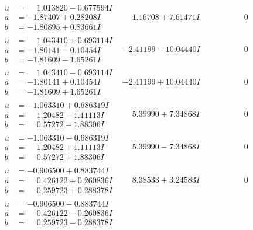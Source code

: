 \documentclass[1p]{elsarticle_modified}
\theoremstyle{definition}
\begin{document}
$$\begin{array}{c|c|c}
\begin{aligned}
u &= \phantom{-}1.013820 - 0.677594 I \\
a &= -1.87407 + 0.28208 I \\
b &= -1.80895 + 0.83661 I\end{aligned}
 & \phantom{-}1.16708 + 7.61471 I & \phantom{-0.000000 } 0 \\ \hline\begin{aligned}
u &= \phantom{-}1.043410 + 0.693114 I \\
a &= -1.80141 - 0.10454 I \\
b &= -1.81609 - 1.65261 I\end{aligned}
 & -2.41199 - 10.04440 I & \phantom{-0.000000 } 0 \\ \hline\begin{aligned}
u &= \phantom{-}1.043410 - 0.693114 I \\
a &= -1.80141 + 0.10454 I \\
b &= -1.81609 + 1.65261 I\end{aligned}
 & -2.41199 + 10.04440 I & \phantom{-0.000000 } 0 \\ \hline\begin{aligned}
u &= -1.063310 + 0.686319 I \\
a &= \phantom{-}1.20482 - 1.11113 I \\
b &= \phantom{-}0.57272 - 1.88306 I\end{aligned}
 & \phantom{-}5.39990 + 7.34868 I & \phantom{-0.000000 } 0 \\ \hline\begin{aligned}
u &= -1.063310 - 0.686319 I \\
a &= \phantom{-}1.20482 + 1.11113 I \\
b &= \phantom{-}0.57272 + 1.88306 I\end{aligned}
 & \phantom{-}5.39990 - 7.34868 I & \phantom{-0.000000 } 0 \\ \hline\begin{aligned}
u &= -0.906500 + 0.883744 I \\
a &= \phantom{-}0.426122 + 0.260836 I \\
b &= \phantom{-}0.259723 + 0.288378 I\end{aligned}
 & \phantom{-}8.38533 + 3.24583 I & \phantom{-0.000000 } 0 \\ \hline\begin{aligned}
u &= -0.906500 - 0.883744 I \\
a &= \phantom{-}0.426122 - 0.260836 I \\
b &= \phantom{-}0.259723 - 0.288378 I\end{aligned}

\end{array}$$
\end{document}
